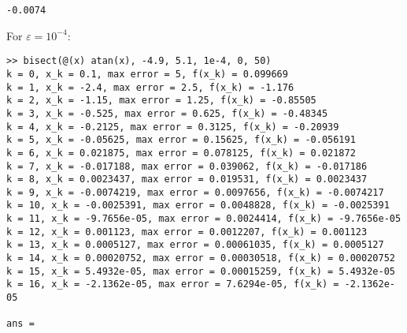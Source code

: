\documentclass{homework}
\begin{document}
\begin{alphaparts}
\begin{enumerate}[label=\textbf{(\arabic*)}]
\begin{lstlisting}[basicstyle=\small\ttfamily, frame=single]
  -0.0074
		\end{lstlisting}
		For $\varepsilon = 10^{-4}$:
		\begin{lstlisting}[basicstyle=\small\ttfamily, frame=single]
>> bisect(@(x) atan(x), -4.9, 5.1, 1e-4, 0, 50)
k = 0, x_k = 0.1, max error = 5, f(x_k) = 0.099669
k = 1, x_k = -2.4, max error = 2.5, f(x_k) = -1.176
k = 2, x_k = -1.15, max error = 1.25, f(x_k) = -0.85505
k = 3, x_k = -0.525, max error = 0.625, f(x_k) = -0.48345
k = 4, x_k = -0.2125, max error = 0.3125, f(x_k) = -0.20939
k = 5, x_k = -0.05625, max error = 0.15625, f(x_k) = -0.056191
k = 6, x_k = 0.021875, max error = 0.078125, f(x_k) = 0.021872
k = 7, x_k = -0.017188, max error = 0.039062, f(x_k) = -0.017186
k = 8, x_k = 0.0023437, max error = 0.019531, f(x_k) = 0.0023437
k = 9, x_k = -0.0074219, max error = 0.0097656, f(x_k) = -0.0074217
k = 10, x_k = -0.0025391, max error = 0.0048828, f(x_k) = -0.0025391
k = 11, x_k = -9.7656e-05, max error = 0.0024414, f(x_k) = -9.7656e-05
k = 12, x_k = 0.001123, max error = 0.0012207, f(x_k) = 0.001123
k = 13, x_k = 0.0005127, max error = 0.00061035, f(x_k) = 0.0005127
k = 14, x_k = 0.00020752, max error = 0.00030518, f(x_k) = 0.00020752
k = 15, x_k = 5.4932e-05, max error = 0.00015259, f(x_k) = 5.4932e-05
k = 16, x_k = -2.1362e-05, max error = 7.6294e-05, f(x_k) = -2.1362e-05

ans =


\end{lstlisting}
\end{enumerate}
\end{alphaparts}
\end{document}
